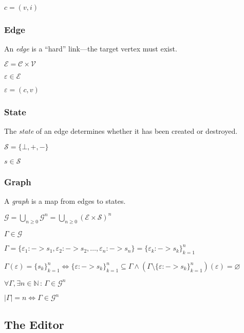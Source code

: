 \documentclass[letterpaper,12pt]{article}
\def\C{\mathcal{C}}
\def\E{\mathcal{E}}
\def\G{\mathcal{G}}
\def\S{\mathcal{S}}
\def\V{\mathcal{V}}
\def\e{\varepsilon}
\def\None{\varnothing}
\begin{document}
$c = (v, i)$


\subsubsection{Edge}
\label{sec:edge}

An \emph{edge} is a ``hard'' link---the target vertex must exist.

$\E = \C \times \V$

$\e \in \E$

$\e = (c, v)$


\subsubsection{State}
\label{sec:state}

The \emph{state} of an edge determines whether it has been created or
destroyed.

$\S = \{\bot,+,-\}$

$s \in \S$


\subsubsection{Graph}
\label{sec:graph}

A \emph{graph} is a map from edges to states.

$\G = \bigcup\limits_{n \ge 0}\G^n = \bigcup\limits_{n \ge 0}(\E \times \S)^n$

$\Gamma \in \G$

$\Gamma = \{\e_1 :-> s_1, \e_2 :-> s_2, \ldots, \e_n :-> s_n\} = \{\e_k :-> s_k\}_{k=1}^n$

$\Gamma(\e) = \{s_k\}_{k=1}^n \iff \{\e :-> s_k\}_{k=1}^n \subseteq \Gamma
\land (\Gamma \setminus \{\e :-> s_k\}_{k=1}^n)(\e) = \None$

$\forall \Gamma, \exists n \in \mathbb{N} \,:\, \Gamma \in \G^n$

$| \Gamma | = n \iff \Gamma \in \G^n$


\subsection{The Editor}
\label{sec:the-editor}
\end{document}
